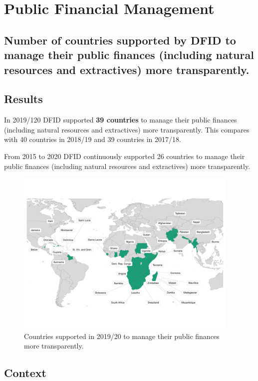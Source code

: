 \chapter{Public Financial Management}

\section*{Number of countries supported by DFID to manage their public finances (including natural resources and extractives) more transparently.}
\thispagestyle{empty}

\section{Results}

In 2019/120 DFID supported \textbf{39 countries} to manage their public finances (including natural resources and extractives) more transparently. %
This compares with 40 countries in 2018/19 and 39 countries in 2017/18. %

From 2015 to 2020 DFID continuously supported 26 countries to manage their public finances (including natural resources and extractives) more transparently.
%

\begin{figure}[htbp]
  \centering
  \includegraphics[width=0.95\textwidth]{../figs/pfm_plot} \hfill
  \caption{Countries supported in 2019/20 to manage their public finances more transparently.}
  \label{fig:pfm_plot}
\end{figure}


\section{Context}

